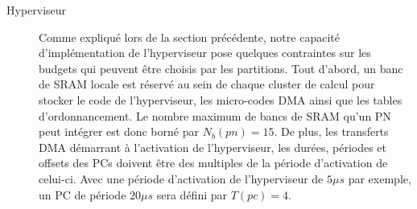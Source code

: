 \documentclass[main.tex]{subfiles}
\begin{document}
\begin{description}
\begin{enumerate}
        \end{enumerate}
    \item[Hyperviseur]
        Comme expliqué lors de la section précédente, notre capacité d'implémentation de l'hyperviseur pose quelques contraintes sur les budgets qui peuvent être choisis par les partitions. Tout d'abord, un banc de SRAM locale est réservé au sein de chaque cluster de calcul pour stocker le code de l'hyperviseur, les micro-codes DMA ainsi que les tables d'ordonnancement. Le nombre maximum de bancs de SRAM qu'un PN peut intégrer est donc borné par $N_b(pn) = 15$. De plus, les transferts DMA démarrant à l'activation de l'hyperviseur, les durées, périodes et offsets des PCs doivent être des multiples de la période d'activation de celui-ci. Avec une période d'activation de l'hyperviseur de $5 \mu s$ par exemple, un PC de période $20 \mu s$ sera défini par $T(pc) = 4$.
\end{description}
\end{document}
